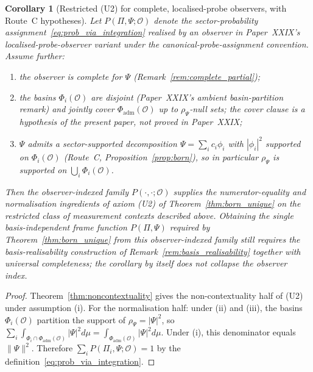 \documentclass[12pt]{article}
\newtheorem{corollary}[theorem]{Corollary}
\newcommand{\Ocal}{\mathcal{O}}
\begin{document}
\begin{corollary}[Restricted (U2) for complete, localised-probe observers, with Route~C hypotheses]\label{cor:U2_derived}
Let $P(\Pi, \Psi; \Ocal)$ denote the sector-probability assignment~\eqref{eq:prob_via_integration} realised by an observer in Paper~XXIX's localised-probe-observer variant under the canonical-probe-assignment convention. Assume further:
\begin{enumerate}
    \item[\emph{(i)}] the observer is complete for $\Psi$ (Remark~\ref{rem:complete_partial});
    \item[\emph{(ii)}] the basins $\Phi_i(\Ocal)$ are disjoint (Paper~XXIX's ambient basin-partition remark) \emph{and} jointly cover $\Phi_{\mathrm{adm}}(\Ocal)$ up to $\rho_\Psi$-null sets; the cover clause is a hypothesis of the present paper, not proved in Paper~XXIX;
    \item[\emph{(iii)}] $\Psi$ admits a sector-supported decomposition $\Psi = \sum_i c_i \phi_i$ with $|\phi_i|^2$ supported on $\Phi_i(\Ocal)$ (Route~C, Proposition~\ref{prop:born}), so in particular $\rho_\Psi$ is supported on $\bigcup_i \Phi_i(\Ocal)$.
\end{enumerate}
Then the observer-indexed family $P(\cdot, \cdot; \Ocal)$ supplies the numerator-equality and normalisation ingredients of axiom (U2) of Theorem~\ref{thm:born_unique} on the restricted class of measurement contexts described above. Obtaining the single basis-independent frame function $P(\Pi, \Psi)$ required by Theorem~\ref{thm:born_unique} from this observer-indexed family still requires the basis-realisability construction of Remark~\ref{rem:basis_realisability} together with universal completeness; the corollary by itself does not collapse the observer index.
\end{corollary}

\begin{proof}
Theorem~\ref{thm:noncontextuality} gives the non-contextuality half of (U2) under assumption (i). For the normalisation half: under (ii) and (iii), the basins $\Phi_i(\Ocal)$ partition the support of $\rho_\Psi = |\Psi|^2$, so $\sum_i \int_{\Phi_i \cap \Phi_{\mathrm{adm}}(\Ocal)}|\Psi|^2 d\mu = \int_{\Phi_{\mathrm{adm}}(\Ocal)}|\Psi|^2 d\mu$. Under (i), this denominator equals $\|\Psi\|^2$. Therefore $\sum_i P(\Pi_i, \Psi; \Ocal) = 1$ by the definition~\eqref{eq:prob_via_integration}.
\end{proof}
\end{document}
